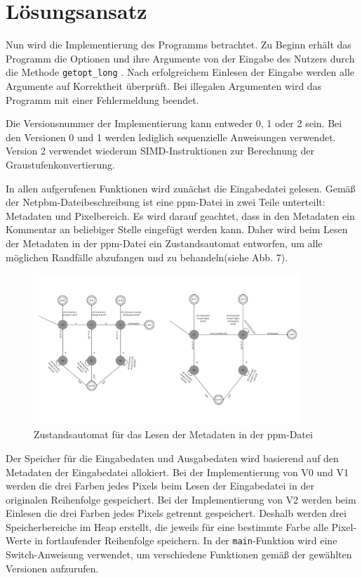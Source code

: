 \documentclass[course=erap]{aspdoc}
\begin{document}
\section{Lösungsansatz}

\par
Nun wird die Implementierung des Programms betrachtet. Zu Beginn erhält das Programm die Optionen und ihre Argumente von der Eingabe des Nutzers durch die Methode \texttt{getopt\_long} \cite{getoptlong3}. Nach erfolgreichem Einlesen der Eingabe werden alle Argumente auf Korrektheit überprüft. Bei illegalen Argumenten wird das Programm mit einer Fehlermeldung beendet.

\par
Die Versionsnummer der Implementierung kann entweder 0, 1 oder 2 sein. Bei den Versionen 0 und 1 werden lediglich sequenzielle Anweisungen verwendet. Version 2 verwendet wiederum SIMD-Instruktionen zur Berechnung der Graustufenkonvertierung.

\par
In allen aufgerufenen Funktionen wird zunächst die Eingabedatei gelesen. Gemäß der Netpbm-Dateibeschreibung ist eine ppm-Datei in zwei Teile unterteilt: Metadaten und Pixelbereich. Es wird darauf geachtet, dass in den Metadaten ein Kommentar an beliebiger Stelle eingefügt werden kann. Daher wird beim Lesen der Metadaten in der ppm-Datei ein Zustandsautomat entworfen, um alle möglichen Randfälle abzufangen und zu behandeln(siehe Abb. 7).

\begin{figure}[h]
    \centering
    \includegraphics[width=0.9\textwidth]{Bilder/auto.png}
    \caption{Zustandsautomat für das Lesen der Metadaten in der ppm-Datei}
\end{figure}

\par
Der Speicher für die Eingabedaten und Ausgabedaten wird basierend auf den Metadaten der Eingabedatei allokiert. Bei der Implementierung von V0 und V1 werden die drei Farben jedes Pixels beim Lesen der Eingabedatei in der originalen Reihenfolge gespeichert. Bei der Implementierung von V2 werden beim Einlesen die drei Farben jedes Pixels getrennt gespeichert. Deshalb werden drei Speicherbereiche im Heap erstellt, die jeweils für eine bestimmte Farbe alle Pixel-Werte in fortlaufender Reihenfolge speichern. In der \texttt{main}-Funktion wird eine Switch-Anweisung verwendet, um verschiedene Funktionen gemäß der gewählten Versionen aufzurufen.
\end{document}
